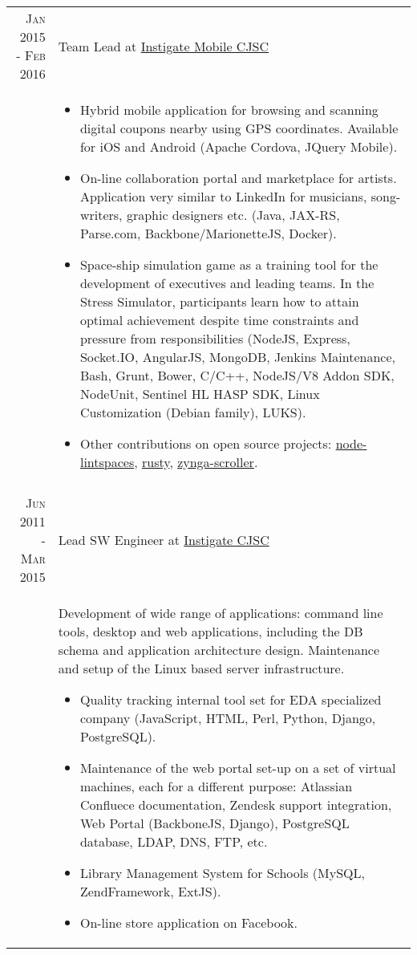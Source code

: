 \documentclass[a4paper,10pt]{article}
\begin{document}
\begin{tabular}{r|p{11cm}}


\textsc{Jan 2015 - Feb 2016}
  & Team Lead at
    \href{http://www.instigatemobile.com/}{Instigate Mobile CJSC} \\

& \footnotesize{
  \begin{itemize}
    \item Hybrid mobile application for browsing and scanning digital coupons
    nearby using GPS coordinates. Available for iOS and Android (Apache
    Cordova, JQuery Mobile).
    \item On-line collaboration portal and marketplace for artists.
    Application very similar to LinkedIn for musicians, song-writers, graphic
    designers etc. (Java, JAX-RS, Parse.com, Backbone/MarionetteJS, Docker).
    \item Space-ship simulation game as a training tool for the development of
    executives and leading teams. In the Stress Simulator, participants learn
    how to attain optimal achievement despite time constraints and pressure
    from responsibilities (NodeJS, Express, Socket.IO, AngularJS, MongoDB, Jenkins Maintenance, Bash, Grunt, Bower, C/C++, NodeJS/V8 Addon SDK, NodeUnit, Sentinel HL HASP SDK, Linux Customization (Debian family), LUKS).
    \item Other contributions on open source projects:
      \href{https://github.com/vahe-evoyan/node-lintspaces}{node-lintspaces},
      \href{https://github.com/InstigateMobileCJSC/rusty}{rusty},
      \href{https://github.com/InstigateMobileCJSC/scroller}{zynga-scroller}.
  \end{itemize}
} \\


\multicolumn{2}{c}{} \\


\textsc{Jun 2011 - Mar 2015}
  & Lead SW Engineer at
    \href{http://www.instigatedesign.com/}{Instigate CJSC} \\

& \footnotesize{ Development of wide range of applications: command line tools,
desktop and web applications, including the DB schema and application
architecture design. Maintenance and setup of the Linux based server infrastructure.
  \begin{itemize}
    \item Quality tracking internal tool set for EDA specialized company
      (JavaScript, HTML, Perl, Python, Django, PostgreSQL).
    \item Maintenance of the web portal set-up on a set of virtual machines,
      each for a different purpose: Atlassian Confluece documentation, Zendesk
      support integration, Web Portal (BackboneJS, Django), PostgreSQL
      database, LDAP, DNS, FTP, etc.
    \item Library Management System for Schools (MySQL, ZendFramework, ExtJS).
    \item On-line store application on Facebook.
  \end{itemize}
} \\



\end{tabular}
\end{document}
